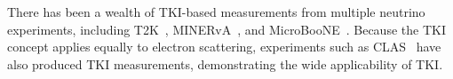 There has been a wealth of TKI-based measurements from multiple neutrino experiments, including T2K~\cite{T2K:2018rnz, T2K:2021naz}, MINERvA~\cite{MINERvA:2018hba, MINERvA:2019ope, MINERvA:2020anu, MINERvA:2021csy}, and MicroBooNE~\cite{MicroBooNE:2022emb, MicroBooNE:2023cmw, MicroBooNE:2023tzj, MicroBooNE:2023wzy, MicroBooNE:2024tmp}.
Because the TKI concept applies equally to electron scattering, experiments such as CLAS~\cite{CLAS:2021neh} have also produced TKI measurements, demonstrating the wide applicability of TKI.
